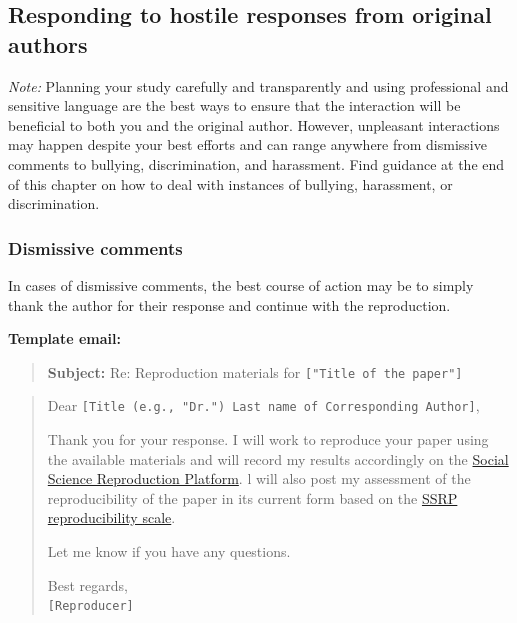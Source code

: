 \documentclass[
  openany]{book}
\begin{document}
\hypertarget{responding-to-hostile-responses-from-original-authors}{%
\subsection{Responding to hostile responses from original authors}\label{responding-to-hostile-responses-from-original-authors}}

\emph{Note:} Planning your study carefully and transparently and using professional and sensitive language are the best ways to ensure that the interaction will be beneficial to both you and the original author. However, unpleasant interactions may happen despite your best efforts and can range anywhere from dismissive comments to bullying, discrimination, and harassment. Find guidance at the end of this chapter on how to deal with instances of bullying, harassment, or discrimination.

\hypertarget{dismissive-comments}{%
\subsubsection{Dismissive comments}\label{dismissive-comments}}

In cases of dismissive comments, the best course of action may be to simply thank the author for their response and continue with the reproduction.

\textbf{Template email:}

\begin{quote}
\textbf{Subject:} Re: Reproduction materials for \texttt{{[}"Title\ of\ the\ paper"{]}}
\end{quote}

\begin{quote}
Dear \texttt{{[}Title\ (e.g.,\ "Dr.")\ Last\ name\ of\ Corresponding\ Author{]}},

Thank you for your response. I will work to reproduce your paper using the available materials and will record my results accordingly on the \href{https://www.socialsciencereproduction.org/}{Social Science Reproduction Platform}. l will also post my assessment of the reproducibility of the paper in its current form based on the \href{https://bitss.github.io/ACRE/assessment.html\#levels-of-computational-reproducibility-for-a-specific-output}{SSRP reproducibility scale}.

Let me know if you have any questions.

Best regards,\\
\texttt{{[}Reproducer{]}}
\end{quote}
\end{document}
